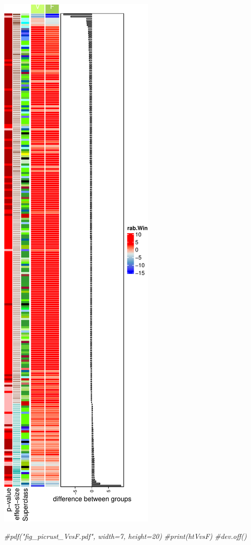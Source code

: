 \documentclass[]{interact}
\theoremstyle{plain}%
\theoremstyle{definition}
\theoremstyle{remark}
\newenvironment{Shaded}{\begin{snugshade}}{\end{snugshade}}
\newcommand{\CommentTok}[1]{\textcolor[rgb]{0.56,0.35,0.01}{\textit{#1}}}
\begin{document}
\begin{center}\includegraphics{Doc_pdf_files/figure-latex/unnamed-chunk-43-1} \end{center}

\begin{Shaded}
\begin{Highlighting}[]
\CommentTok{\#pdf("fig\_picrust\_VvsF.pdf", width=7, height=20)}
\CommentTok{\#print(htVvsF)}
\CommentTok{\#dev.off()}
\end{Highlighting}
\end{Shaded}
\end{document}
